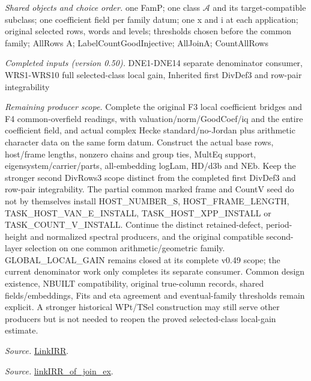 \emph{Shared objects and choice order.} one FamP; one class $\mathcal A$ and its target-compatible subclass; one coefficient field per family datum; one x and i at each application; original selected rows, words and levels; thresholds chosen before the common family; AllRows A; LabelCountGoodInjective; AllJoinA; CountAllRows

\emph{Completed inputs (version 0.50).} DNE1-DNE14 separate denominator consumer, WRS1-WRS10 full selected-class local gain, Inherited first DivDef3 and row-pair integrability

\emph{Remaining producer scope.} Complete the original F3 local coefficient bridges and F4 common-overfield readings, with valuation/norm/GoodCoef/iq and the entire coefficient field, and actual complex Hecke standard/no-Jordan plus arithmetic character data on the same form datum. Construct the actual base rows, host/frame lengths, nonzero chains and group ties, MultEq support, eigensystem/carrier/parts, all-embedding logLam, HD/d3b and NEb. Keep the stronger second DivRows3 scope distinct from the completed first DivDef3 and row-pair integrability. The partial common marked frame and CountV seed do not by themselves install HOST\_\allowbreak NUMBER\_\allowbreak S, HOST\_\allowbreak FRAME\_\allowbreak LENGTH, TASK\_\allowbreak HOST\_\allowbreak VAN\_\allowbreak E\_\allowbreak INSTALL, TASK\_\allowbreak HOST\_\allowbreak XPP\_\allowbreak INSTALL or TASK\_\allowbreak COUNT\_\allowbreak V\_\allowbreak INSTALL. Continue the distinct retained-defect, period-height and normalized spectral producers, and the original compatible second-layer selection on one common arithmetic/geometric family. GLOBAL\_\allowbreak LOCAL\_\allowbreak GAIN remains closed at its complete v0.49 scope; the current denominator work only completes its separate consumer. Common design existence, NBUILT compatibility, original true-column records, shared fields/embeddings, Fits and eta agreement and eventual-family thresholds remain explicit. A stronger historical WPt/TSel construction may still serve other producers but is not needed to reopen the proved selected-class local-gain estimate.

\emph{Source.} \href{https://github.com/CocoSgt/riemann-hypothesis-lean/blob/7cbf7a0c32fca1badf05931879a37c3f8a2b03b4/src/Formalism/SharpRestriction/GlobalTheoremInputs.lean#L55-L58}{LinkIRR}.

\emph{Source.} \href{https://github.com/CocoSgt/riemann-hypothesis-lean/blob/7cbf7a0c32fca1badf05931879a37c3f8a2b03b4/src/Development/AbelianVarietyTheory/Proofs/GlobalInterpolation/LinkIRROfJoinEx.lean#L17-L38}{linkIRR\_\allowbreak of\_\allowbreak join\_\allowbreak ex}.

